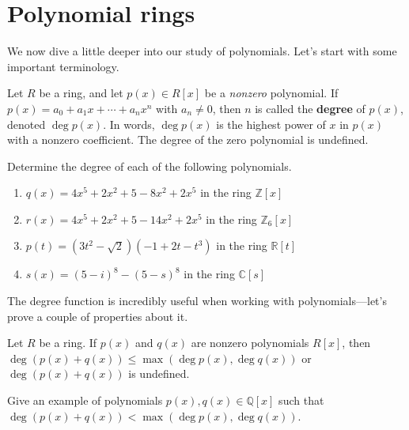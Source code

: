 \section{Polynomial rings}

We now dive a little deeper into our study of polynomials. Let's start with some important terminology.

\begin{definition}
Let $R$ be a ring, and let  $p(x)\in R[x]$ be a \emph{nonzero} polynomial. If $p(x) = a_0 + a_1x + \cdots + a_nx^n$ with $a_n \neq 0$, then $n$ is called the \textbf{degree} of $p(x)$, denoted $\deg p(x)$. In words, $\deg p(x)$ is the highest power of $x$ in $p(x)$ with a nonzero coefficient. The degree of the zero polynomial is undefined.
\end{definition}

\begin{problem}
Determine the degree of each of the following polynomials.
\begin{enumerate}
\item $q(x) = 4x^5 + 2x^2 + 5 -8x^2 +2x^5$ in the ring $\mathbb{Z}[x]$
\item $r(x) = 4x^5 + 2x^2 + 5 -14x^2 +2x^5$ in the ring $\mathbb{Z}_6[x]$
\item $p(t) = (3t^2-\sqrt{2})(-1 + 2t -t^3)$ in the ring $\mathbb{R}[t]$
\item $s(x) = (5-i)^8 - (5-s)^8$ in the ring $\mathbb{C}[s]$
\end{enumerate}
\end{problem}

The degree function is incredibly useful when working with polynomials---let's prove a couple of properties about it. 

\begin{theorem}\label{thm.DegreePolySum}
Let $R$ be a ring. If $p(x)$ and $q(x)$ are nonzero polynomials $R[x]$, then $\deg(p(x) + q(x)) \le \max(\deg p(x),\deg q(x))$ or  $\deg(p(x) + q(x))$ is undefined.
\end{theorem}

\begin{problem}
Give an example of polynomials $p(x),q(x)\in \mathbb{Q}[x]$ such that $\deg(p(x)+q(x)) < \max(\deg p(x),\deg q(x))$.
\end{problem}


